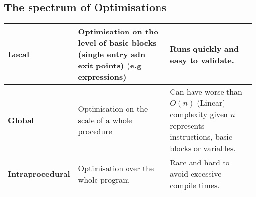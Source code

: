 \documentclass{report}
\begin{document}
        \subsection*{The spectrum of Optimisations}
            \begin{center}
                \begin{tabular}{l | p{}  | p{}}
                    \textbf{Local} & Optimisation on the level of basic blocks (single entry adn exit points) (e.g expressions) & Runs quickly and easy to validate. \\
                    \hline
                    \textbf{Global} & Optimisation on the scale of a whole procedure & Can have worse than $O(n)$ (Linear) complexity given $n$ represents instructions, basic blocks or variables. \\
                    \hline
                    \textbf{Intraprocedural} & Optimisation over the whole program & Rare and hard to avoid excessive compile times. \\
                \end{tabular}
            \end{center}
\end{document}
